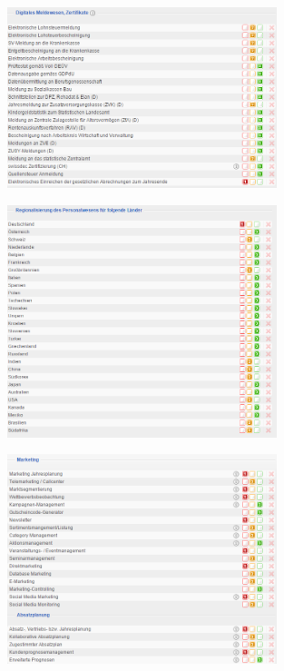 \documentclass[12pt]{article}
\begin{document}
\noindent
\begin{figure}[here!]
\centering
\includegraphics[width=0.7\textwidth]{images/tr8}
\end{figure}\FloatBarrier
\noindent
\begin{figure}[here!]
\centering
\includegraphics[width=0.7\textwidth]{images/tr9}
\end{figure}\FloatBarrier
\noindent
\begin{figure}[here!]
\centering
\includegraphics[width=0.7\textwidth]{images/tr10}
\end{figure}\FloatBarrier
\end{document}
